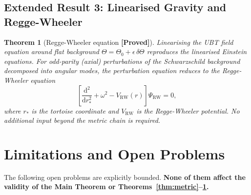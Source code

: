 \documentclass[12pt,a4paper]{article}
\newtheorem{theorem}{Theorem}[section]
\theoremstyle{definition}
\theoremstyle{remark}
\newcommand{\PROVED}{\textbf{[Proved]}}
\begin{document}
\subsection{Extended Result 3: Linearised Gravity and Regge-Wheeler}
\label{sec:rw}

\begin{theorem}[Regge-Wheeler equation \PROVED]
\label{thm:rw}
Linearising the UBT field equation around flat background
$\Theta=\Theta_0+\epsilon\,\delta\Theta$ reproduces the linearised
Einstein equations.  For odd-parity (axial) perturbations of the
Schwarzschild background decomposed into angular modes, the perturbation
equation reduces to the Regge-Wheeler equation
\[
  \left[\frac{\mathrm{d}^2}{\mathrm{d}r_*^2} + \omega^2
        - V_{\mathrm{RW}}(r)\right]\Psi_{\mathrm{RW}} = 0,
\]
where $r_*$ is the tortoise coordinate and $V_{\mathrm{RW}}$ is the
Regge-Wheeler potential.  No additional input beyond the metric chain
is required.
\end{theorem}

\section{Limitations and Open Problems}
\label{sec:limits}

The following open problems are explicitly bounded.
\textbf{None of them affect the validity of the Main Theorem or
Theorems~\ref{thm:metric}--\ref{thm:rw}.}
\end{document}
